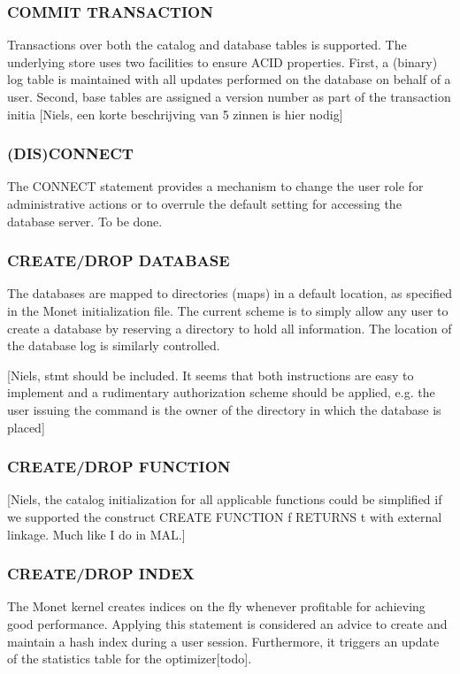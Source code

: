 \documentclass[10pt,twocolumn,fleqn]{article}
\begin{document}
\subsubsection*{COMMIT TRANSACTION }
Transactions over both the catalog and database tables is supported.
The underlying store uses two facilities to ensure ACID properties.
First, a (binary) log table is maintained with all updates performed
on the database on behalf of a user. Second, base tables are assigned
a version number as part of the transaction initia
[Niels, een korte beschrijving van 5 zinnen is hier nodig]

\subsubsection*{(DIS)CONNECT }

The CONNECT statement provides a mechanism to change the user role
for administrative actions or to overrule the default setting for
accessing the database server. To be done.

\subsubsection*{CREATE/DROP DATABASE}
The databases are mapped to directories (maps) in a default location, as 
specified in the Monet initialization file. The current scheme is 
to simply allow any user to create a database by reserving a
directory to hold all information. The location of the database
log is similarly controlled.

[Niels, stmt should be included. It seems that both instructions are
easy to implement and a rudimentary authorization scheme should be
applied, e.g. the user issuing the command is the owner of the directory
in which the database is placed]

\subsubsection*{CREATE/DROP FUNCTION}
[Niels, the catalog initialization for all applicable
functions could be simplified if we supported the construct
CREATE FUNCTION f RETURNS t
with external linkage. Much like I do in MAL.]

\subsubsection*{CREATE/DROP INDEX}

The Monet kernel creates indices on the fly whenever profitable for
achieving good performance. Applying this statement is considered
an advice to create and maintain a hash index during a user session.
Furthermore, it triggers an update of the statistics table for the
optimizer[todo].
\end{document}
